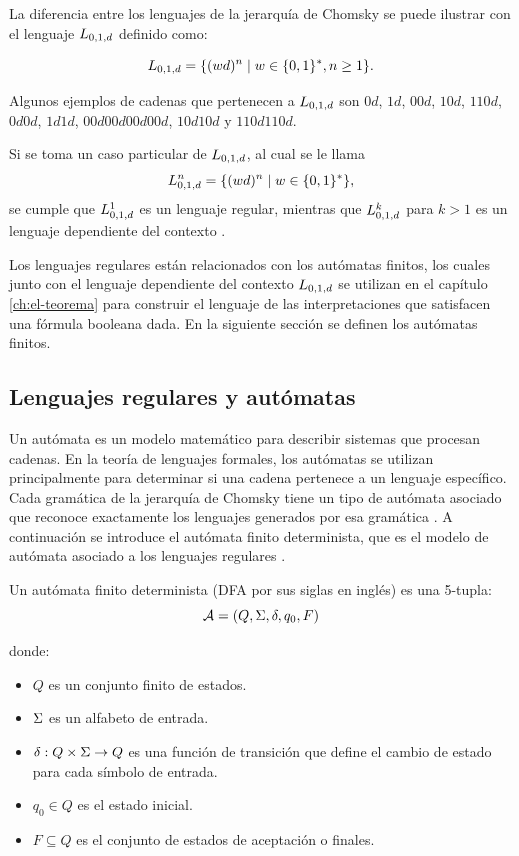 La diferencia entre los lenguajes de la jerarquía de Chomsky se puede ilustrar con el lenguaje $L_{0,1,d}$ definido como:

$$
	L_{0,1,d} = \{(wd)^n \;|\; w \in \{0, 1\}^*, n \geq 1\}.
$$

Algunos ejemplos de cadenas que pertenecen a $L_{0,1,d}$ son $0d$, $1d$, $00d$, $10d$, $110d$, $0d0d$, $1d1d$, $00d00d00d00d$, $10d10d$ y $110d110d$.

Si se toma un caso particular de $L_{0,1,d}$, al cual se le llama
$$
	L_{0,1,d}^n = \{(wd)^n \;|\; w \in \{0, 1\}^*\},
$$
se cumple que $L_{0,1,d}^1$ es un lenguaje regular, mientras que $L_{0,1,d}^k$ para $k > 1$ es un lenguaje dependiente del contexto \cite{automataTheory}.

Los lenguajes regulares están relacionados con los autómatas finitos, los cuales junto con el lenguaje dependiente del contexto $L_{0,1,d}$ se utilizan en el capítulo \ref{ch:el-teorema} para construir el lenguaje de las interpretaciones que satisfacen una fórmula booleana dada. En la siguiente sección se definen los autómatas finitos.

\subsection{Lenguajes regulares y autómatas}
\label{sec:automata}

Un autómata es un modelo matemático para describir sistemas que procesan cadenas. En la teoría de lenguajes formales, los autómatas se utilizan principalmente para determinar si una cadena pertenece a un lenguaje específico. Cada gramática de la jerarquía de Chomsky tiene un tipo de autómata asociado que reconoce exactamente los lenguajes generados por esa gramática \cite{automataTheory}. A continuación se introduce el autómata finito determinista, que es el modelo de autómata asociado a los lenguajes regulares \cite{automataTheory}.

\begin{definition}
	Un autómata finito determinista (DFA por sus siglas en inglés) \cite{automataTheory} es una 5-tupla:
	$$
		\mathcal{A} = (Q, \Sigma, \delta, q_0, F)
	$$

	donde:
	\begin{itemize}
		\item $Q$ es un conjunto finito de estados.
		\item $\Sigma$ es un alfabeto de entrada.
		\item $\delta: Q \times \Sigma \to Q$ es una función de transición que define el cambio de estado para cada símbolo de entrada.
		\item $q_0 \in Q$ es el estado inicial.
		\item $F \subseteq Q$ es el conjunto de estados de aceptación o finales.
	\end{itemize}
\end{definition}

